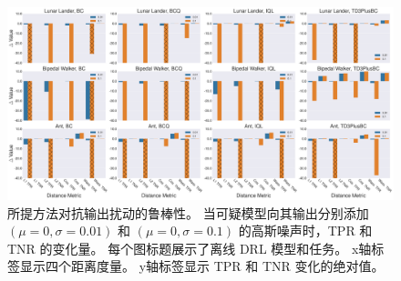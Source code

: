 \begin{figure}[!ht]
    \centering
    \includegraphics[width=\hsize]{figure/orl_auditor/overall_result_20230201162017541-output_gaussian_noise.pdf}
    \caption{
    所提方法对抗输出扰动的鲁棒性。
    当可疑模型向其输出分别添加 $(\mu=0, \sigma=0.01)$ 和 $(\mu=0, \sigma=0.1)$ 的高斯噪声时，TPR 和 TNR 的变化量。
    每个图标题展示了离线 DRL 模型和任务。
    x轴标签显示四个距离度量。
    y轴标签显示 TPR 和 TNR 变化的绝对值。
    }
    \label{fig:robustness}
\end{figure}

